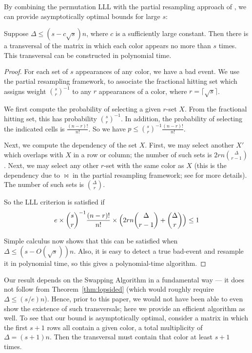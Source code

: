 By combining the permutation LLL with the partial resampling approach of \cite{harris-srin2}, we can provide asymptotically optimal bounds for large $s$:
\begin{theorem}
\label{szabo-thm}
Suppose $\Delta \leq (s - c \sqrt{s}) n$, where $c$ is a sufficiently large constant. Then there is a transversal of the matrix in which each color appears no more than $s$ times. This transversal can be constructed in polynomial time.
\end{theorem}
\begin{proof}
For each set of $s$ appearances of any color, we have a bad event. We use the partial resampling framework, to associate the fractional hitting set which assigns weight $\binom{s}{r}^{-1}$ to any $r$ appearances of a color, where $r = \lceil \sqrt{s} \rceil$.

We first compute the probability of selecting a given $r$-set $X$. From the fractional hitting set, this has probability $\binom{s}{r}^{-1}$. In addition, the probability of selecting the indicated cells is $\frac{(n-r)!}{n!}$. So we have $p \leq \binom{s}{r}^{-1} \frac{(n-r)!}{n!}$.

Next, we compute the dependency of the set $X$. First, we may select another $X'$ which overlaps with $X$ in a row or column; the number of such sets is $2 r n \binom{\Delta}{r-1}$. Next, we may select any other $r$-set with the same color as $X$ (this is the dependency due to $\bowtie$ in the partial resampling framework; see \cite{harris-srin2} for more details). The number of such sets is $\binom{\Delta}{r}$.

So the LLL criterion is satisfied if
$$
e \times  \binom{s}{r}^{-1} \frac{(n-r)!}{n!} \times \Bigl( 2 r n \binom{\Delta}{r-1} + \binom{\Delta}{r} \Bigr) \leq 1
$$

Simple calculus now shows that this can be satisfied when $\Delta \leq (s - O(\sqrt{s})) n$. Also, it is easy to detect a true bad-event and resample it in polynomial time, so this gives a polynomial-time algorithm.
\end{proof}

Our result depends on the Swapping Algorithm in a fundamental way --- it does not follow from Theorem~\ref{thm:lopsided} (which would roughly require  $\Delta \leq (s/e) n$). Hence, prior to this paper, we would not have been able to even show the existence of such transversals; here we provide an efficient algorithm as well.
To see that our bound is asymptotically optimal, consider a matrix in which the first $s+1$ rows all contain a given color, a total multiplicity of $\Delta = (s+1) n$. Then the transversal must contain that color at least $s+1$ times.


